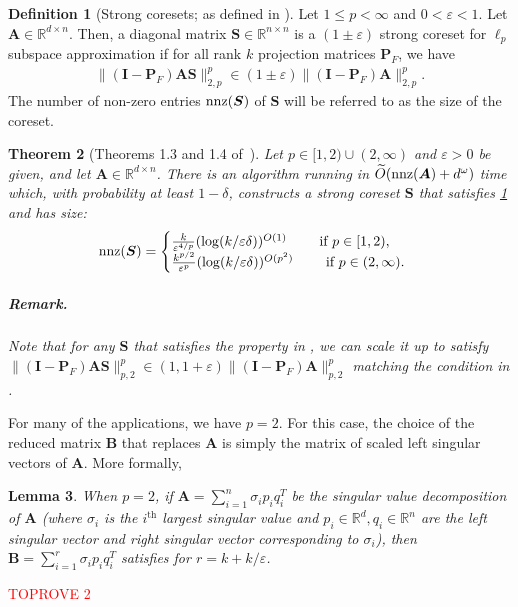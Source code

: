 \documentclass[11pt]{article}
\makeatletter
\newcommand{\sumL}{\sum\limits}
\theoremstyle{plain}
\newtheorem{theorem}{Theorem}[section]
\newtheorem{lemma}[theorem]{Lemma}
\theoremstyle{plain}
\theoremstyle{definition}
\newtheorem{defn}[theorem]{Definition}
\theoremstyle{plain}
\theoremstyle{remark}
\newenvironment{proof}[1][\protect\proofname]{\par
	\normalfont\topsep6\p@\@plus6\p@\relax
	\trivlist
	\itemindent\parindent
	\item[\hskip\labelsep\scshape #1]\ignorespaces
}{\endtrivlist\@endpefalse
}
\providecommand{\proofname}{Proof}
\newcommand{\RR}{\mathbb{R}}
\newcommand{\eps}{\varepsilon}
\makeatother
\begin{document}
\begin{defn}[Strong coresets; as defined in \cite{WY24}]
\label{defn:strong_coreset}
    Let $1\leq p<\infty$ and $0<\varepsilon <1 $. Let $\bm{A}\in \RR^{d\times n}$. Then, a diagonal matrix $\bm{S}\in \RR^{n\times n}$ is a $(1\pm\varepsilon)$ strong coreset for $\ell_p$ subspace approximation if for all rank $k$ projection matrices $\bm{P}_F$, we have
    \begin{align}
\label{eqn:strong_coreset_property}        \|(\bm{I}-\bm{P}_F)\bm{A}\bm{S}\|_{2,p}^p \in  (1\pm \varepsilon)\|(\bm{I}-\bm{P}_F)\bm{A}\|_{2,p}^p.
    \end{align}
The number of non-zero entries  $\textnormal{nnz}(\bm{S})$ of $\bm{S}$ will be referred to as the size of the coreset. 
\end{defn}
\begin{theorem}[Theorems 1.3 and 1.4 of~\cite{WY25}] \label{thm:coresets-lp}
Let $p \in [1, 2) \cup (2, \infty)$ and $\eps >0$ be given, and let $\bm{A}\in \RR^{d\times n}$. There is an algorithm running in $\widetilde{O}(\textnormal{nnz}(\bm{A})+d^\omega)$ time which, with probability at least $1-\delta$, constructs a strong coreset $\bm{S}$ that satisfies \cref{defn:strong_coreset} and has size:
\begin{equation}\label{eq:coreset-size-lp}
\textnormal{nnz}(\bm{S}) = \begin{cases}
\frac{k}{\varepsilon^{4/p}}(\log(k/\varepsilon \delta))^{O(1)} \qquad \text{ if $p \in [1, 2)$}, \\
\frac{k^{p/2}}{\varepsilon^{p}}(\log(k/\varepsilon \delta))^{O(p^2)} \qquad \text{ if $p \in (2, \infty)$}.
\end{cases}
\end{equation}
\subparagraph*{Remark.} Note that for any $\bm{S}$ that satisfies the property in , we can scale it up to satisfy  $\|(\bm{I}-\bm{P}_F)\bm{A}\bm{S}\|_{p,2}^p \in  (1, 1+\varepsilon)\|(\bm{I}-\bm{P}_F)\bm{A}\|_{p,2}^p$ matching the condition in .
\end{theorem}

For many of the applications, we have $p=2$. For this case, the choice of the reduced matrix $\bm{B}$ that replaces $\bm{A}$ is simply the matrix of scaled left singular vectors of $\bm{A}$. More formally, 
\begin{lemma}
\label{lem:coreset_p=2}
When $p=2$, if $\bm{A}=\sumL_{i=1}^n \sigma_i p_iq_i^T$ be the singular value decomposition of $\bm{A}$ (where $\sigma_i$ is the $i^{\text{th}}$ largest singular value and $p_i\in \RR^d,q_i\in \RR^n$ are the left singular vector and right singular vector corresponding to $\sigma_i$), then $\bm{B}=\sumL_{i=1}^{r} \sigma_i p_iq_i^T$ satisfies  for $r=k+k/\varepsilon$.
\end{lemma}
\begin{proof}\textcolor{red}{TOPROVE 2}\end{proof}
\end{document}
